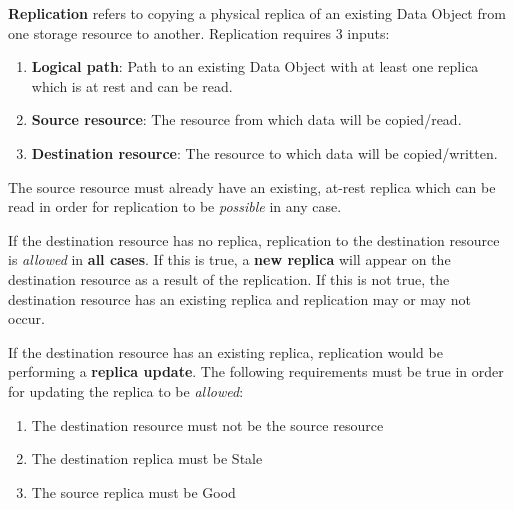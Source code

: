 \documentclass{irodsugm}
\begin{document}
\textbf{Replication} refers to copying a physical replica of an existing Data Object from one storage resource to another. Replication requires 3 inputs:
\begin{enumerate}
    \item \textbf{Logical path}: Path to an existing Data Object with at least one replica which is at rest and can be read.
    \item \textbf{Source resource}: The resource from which data will be copied/read.
    \item \textbf{Destination resource}: The resource to which data will be copied/written.
\end{enumerate}

The source resource must already have an existing, at-rest replica which can be read in order for replication to be \textit{possible} in any case.

If the destination resource has no replica, replication to the destination resource is \textit{allowed} in \textbf{all cases}. If this is true, a \textbf{new replica} will appear on the destination resource as a result of the replication. If this is not true, the destination resource has an existing replica and replication may or may not occur.

If the destination resource has an existing replica, replication would be performing a \textbf{replica update}. The following requirements must be true in order for updating the replica to be \textit{allowed}:
\begin{enumerate}
    \item The destination resource must not be the source resource
    \item The destination replica must be Stale
    \item The source replica must be Good
\end{enumerate}
\end{document}
